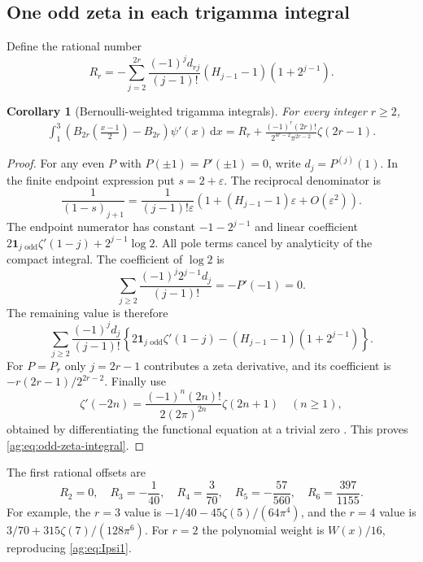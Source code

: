 \documentclass[11pt,letterpaper]{article}
\numberwithin{equation}{section}
\newtheorem{corollary}[theorem]{Corollary}
\theoremstyle{definition}\newtheorem{definition}[theorem]{Definition}
\theoremstyle{remark}\newtheorem{remark}[theorem]{Remark}
\newcommand{\dd}{\,\mathrm d}\newcommand{\ii}{\mathrm i}
\begin{document}
\subsection{One odd zeta in each trigamma integral}
Define the rational number
\begin{equation}\label{ag:eq:Rr}
 R_r=-\sum_{j=2}^{2r}\frac{(-1)^jd_{rj}}{(j-1)!}
                         (H_{j-1}-1)(1+2^{j-1}).
\end{equation}
\begin{corollary}[Bernoulli-weighted trigamma integrals]
\label{ag:cor:odd-zeta}
For every integer $r\ge2$,
\begin{align}
 \boxed{\displaystyle
 \int_1^3\left(B_{2r}\left(\frac{x-1}{2}\right)-B_{2r}\right)
                                  \psi'(x)\dd x
 =R_r+\frac{(-1)^r(2r)!}{2^{4r-2}\pi^{2r-2}}\zeta(2r-1).}
 \label{ag:eq:odd-zeta-integral}
\end{align}
\end{corollary}
\begin{proof}
For any even $P$ with $P(\pm1)=P'(\pm1)=0$, write
$d_j=P^{(j)}(1)$. In the finite endpoint expression put
$s=2+\varepsilon$. The reciprocal denominator is
\[
 \frac1{(1-s)_{j+1}}
 =\frac1{(j-1)!\varepsilon}
     \left(1+(H_{j-1}-1)\varepsilon+O(\varepsilon^2)\right).
\]
The endpoint numerator has constant $-1-2^{j-1}$ and linear coefficient
$2\mathbf1_{j\text{ odd}}\zeta'(1-j)+2^{j-1}\log2$.
All pole terms cancel by analyticity of the compact integral.
The coefficient of $\log2$ is
\[
 \sum_{j\ge2}\frac{(-1)^j2^{j-1}d_j}{(j-1)!}=-P'(-1)=0.
\]
The remaining value is therefore
\[
 \sum_{j\ge2}\frac{(-1)^jd_j}{(j-1)!}
 \left\{2\mathbf1_{j\text{ odd}}\zeta'(1-j)
                     -(H_{j-1}-1)(1+2^{j-1})\right\}.
\]
For $P=P_r$ only $j=2r-1$ contributes a zeta derivative, and its
coefficient is $-r(2r-1)/2^{2r-2}$. Finally use
\[
 \zeta'(-2n)=\frac{(-1)^n(2n)!}{2(2\pi)^{2n}}\zeta(2n+1)
 \quad(n\ge1),
\]
obtained by differentiating the functional equation at a trivial zero
\cite{DLMFintegers}. This proves \eqref{ag:eq:odd-zeta-integral}.
\end{proof}

The first rational offsets are
\[
 R_2=0,\quad R_3=-\frac1{40},\quad R_4=\frac3{70},\quad
 R_5=-\frac{57}{560},\quad R_6=\frac{397}{1155}.
\]
For example, the $r=3$ value is
$-1/40-45\zeta(5)/(64\pi^4)$, and the $r=4$ value is
$3/70+315\zeta(7)/(128\pi^6)$.
For $r=2$ the polynomial weight is $W(x)/16$, reproducing
\eqref{ag:eq:Ipsi1}.
\end{document}
